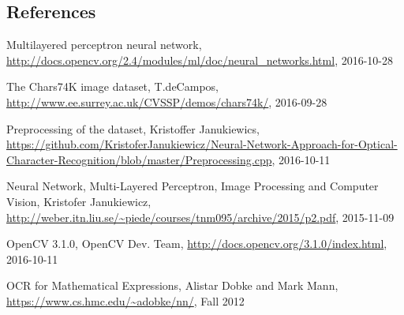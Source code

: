 \documentclass[12pt]{report}
\begin{document}
\newpage
\renewcommand{\bibname}{}
\begin{thebibliography}{}
\section*{References}

 Multilayered perceptron neural network, \url{http://docs.opencv.org/2.4/modules/ml/doc/neural_networks.html}, 2016-10-28

 The Chars74K image dataset, T.deCampos, \url{http://www.ee.surrey.ac.uk/CVSSP/demos/chars74k/}, 2016-09-28 

 Preprocessing of the dataset, Kristoffer Janukiewics,  
\url{https://github.com/KristoferJanukiewicz/Neural-Network-Approach-for-Optical-Character-Recognition/blob/master/Preprocessing.cpp}, 2016-10-11 

 Neural Network, Multi-Layered Perceptron, Image Processing and Computer Vision, Kristofer Janukiewicz, \url{http://weber.itn.liu.se/~piede/courses/tnm095/archive/2015/p2.pdf}, 2015-11-09

 OpenCV 3.1.0, OpenCV Dev. Team, \url{http://docs.opencv.org/3.1.0/index.html}, 2016-10-11

 OCR for Mathematical Expressions, Alistar Dobke and Mark Mann, \url{https://www.cs.hmc.edu/~adobke/nn/}, Fall 2012


\end{thebibliography}
\end{document}
